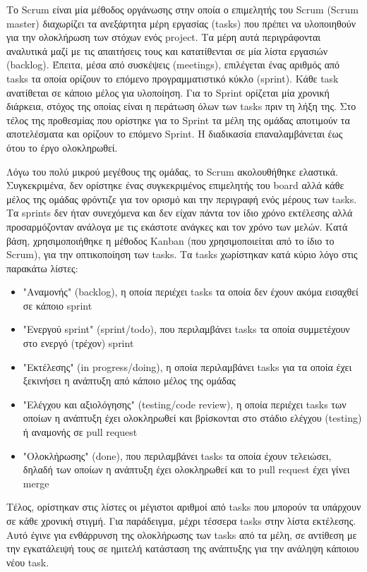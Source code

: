 Το Scrum είναι μία μέθοδος οργάνωσης στην οποία ο επιμελητής του Scrum (Scrum master) διαχωρίζει τα ανεξάρτητα μέρη εργασίας (tasks) που πρέπει να υλοποιηθούν για την ολοκλήρωση των στόχων ενός project. Τα μέρη αυτά περιγράφονται αναλυτικά μαζί με τις απαιτήσεις τους και κατατίθενται σε μία λίστα εργασιών (backlog). Έπειτα, μέσα από συσκέψεις (meetings), επιλέγεται ένας αριθμός από tasks τα οποία ορίζουν το επόμενο προγραμματιστικό κύκλο (sprint). Κάθε task ανατίθεται σε κάποιο μέλος για υλοποίηση. Για το Sprint ορίζεται μία χρονική διάρκεια, στόχος της οποίας είναι η περάτωση όλων των tasks πριν τη λήξη της. Στο τέλος της προθεσμίας που ορίστηκε για το Sprint τα μέλη της ομάδας αποτιμούν τα αποτελέσματα και ορίζουν το επόμενο Sprint. Η διαδικασία επαναλαμβάνεται έως ότου το έργο ολοκληρωθεί.

Λόγω του πολύ μικρού μεγέθους της ομάδας, το Scrum ακολουθήθηκε ελαστικά. Συγκεκριμένα, δεν ορίστηκε ένας συγκεκριμένος επιμελητής του board αλλά κάθε μέλος της ομάδας φρόντιζε για τον ορισμό και την περιγραφή ενός μέρους των tasks. Τα sprints δεν ήταν συνεχόμενα και δεν είχαν πάντα τον ίδιο χρόνο εκτέλεσης αλλά προσαρμόζονταν ανάλογα με τις εκάστοτε ανάγκες και τον χρόνο των μελών. Κατά βάση, χρησιμοποιήθηκε η μέθοδος Kanban (που χρησιμοποιείται από το ίδιο το Scrum), για την οπτικοποίηση των tasks. Τα tasks χωρίστηκαν κατά κύριο λόγο στις παρακάτω λίστες:

\begin{itemize}
    \item "Αναμονής" (backlog), η οποία περιέχει tasks τα οποία δεν έχουν ακόμα εισαχθεί σε κάποιο sprint
    \item "Ενεργού sprint" (sprint/todo), που περιλαμβάνει tasks τα οποία συμμετέχουν στο ενεργό (τρέχον) sprint
    \item "Εκτέλεσης" (in progress/doing), η οποία περιλαμβάνει tasks για τα οποία έχει ξεκινήσει η ανάπτυξη από κάποιο μέλος της ομάδας
    \item "Ελέγχου και αξιολόγησης" (testing/code review), η οποία περιέχει tasks των οποίων η ανάπτυξη έχει ολοκληρωθεί και βρίσκονται στο στάδιο ελέγχου (testing) ή αναμονής σε pull request
    \item "Ολοκλήρωσης" (done), που περιλαμβάνει tasks τα οποία έχουν τελειώσει, δηλαδή των οποίων η ανάπτυξη έχει ολοκληρωθεί και το pull request έχει γίνει merge
\end{itemize}

Τέλος, ορίστηκαν στις λίστες οι μέγιστοι αριθμοί από tasks που μπορούν τα υπάρχουν σε κάθε χρονική στιγμή. Για παράδειγμα, μέχρι τέσσερα tasks στην λίστα εκτέλεσης. Αυτό έγινε για ενθάρρυνση της ολοκλήρωσης των tasks από τα μέλη, σε αντίθεση με την εγκατάλειψή τους σε ημιτελή κατάσταση της ανάπτυξης για την ανάληψη κάποιου νέου task.

